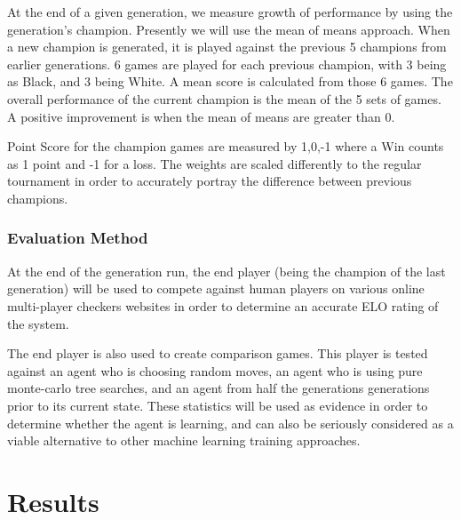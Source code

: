 \documentclass[12pt,a4paper]{article}
\begin{document}
        At the end of a given generation, we measure growth of performance by using the generation's champion. Presently we will use the mean of means approach. When a new champion is generated, it is played against the previous 5 champions from earlier generations. 6 games are played for each previous champion, with 3 being as Black, and 3 being White. A mean score is calculated from those 6 games. The overall performance of the current champion is the mean of the 5 sets of games. A positive improvement is when the mean of means are greater than 0. 

        Point Score for the champion games are measured by {1,0,-1} where a Win counts as 1 point and -1 for a loss. The weights are scaled differently to the regular tournament in order to accurately portray the difference between previous champions.
    
        \subsubsection*{Evaluation Method}
    
        At the end of the generation run, the end player (being the champion of the last generation) will be used to compete against human players on various online multi-player checkers websites in order to determine an accurate ELO rating of the system.
    
        The end player is also used to create comparison games. This player is tested against an agent who is choosing random moves, an agent who is using pure monte-carlo tree searches, and an agent from half the generations generations prior to its current state. These statistics will be used as evidence in order to determine whether the agent is learning, and can also be seriously considered as a viable alternative to other machine learning training approaches.

\section{Results}
    
\end{document}

